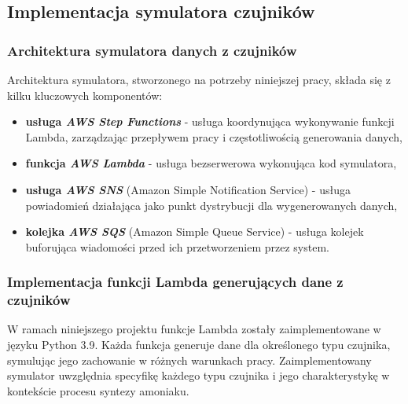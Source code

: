 \subsection{Implementacja symulatora czujników}
\label{subsec:implementacja_symulatora}

\subsubsection{Architektura symulatora danych z czujników}
\label{subsubsec:architektura_symulatora}

Architektura symulatora, stworzonego na potrzeby niniejszej pracy, składa się z kilku kluczowych komponentów:

\begin{itemize}
    \item \textbf{usługa \textit{AWS Step Functions}} - usługa koordynująca wykonywanie funkcji Lambda, zarządzając przepływem pracy i częstotliwością generowania danych,
    \item \textbf{funkcja \textit{AWS Lambda}} \cite{aws_lambda_docs} - usługa bezserwerowa wykonująca kod symulatora,
    \item \textbf{usługa \textit{AWS SNS}} (Amazon Simple Notification Service) \cite{sns_docs} - usługa powiadomień działająca jako punkt dystrybucji dla wygenerowanych danych,
    \item \textbf{kolejka \textit{AWS SQS}} (Amazon Simple Queue Service) \cite{sqs_docs} - usługa kolejek buforująca wiadomości przed ich przetworzeniem przez system.
\end{itemize}

%

\subsubsection{Implementacja funkcji Lambda generujących dane z czujników}
\label{subsubsec:implementacja_lambda}

W ramach niniejszego projektu funkcje Lambda zostały zaimplementowane w języku Python 3.9. Każda funkcja generuje dane dla określonego typu czujnika,
symulując jego zachowanie w różnych warunkach pracy. Zaimplementowany symulator uwzględnia specyfikę każdego typu czujnika i jego charakterystykę w kontekście procesu syntezy amoniaku.

